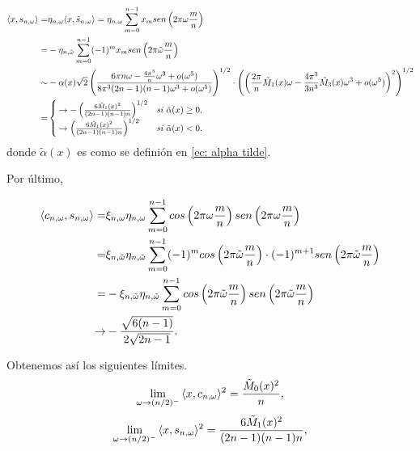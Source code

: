 \begin{align*}
\langle x,
s_{n, \omega}
\rangle = &
\eta_{n, \omega}
\langle
x, \tilde{s}_{n, \omega}
\rangle
= \eta_{n, \omega}
\sum\limits_{m=0}^{n-1}
x_{m}sen\left(
2 \pi \omega\frac{m}{n}
\right)
 \\
= &
- \eta_{n, \tilde{\omega}}
\sum\limits_{m=0}^{n-1}
(-1)^{m}
x_{m}sen\left(
2 \pi \tilde{\omega} \frac{m}{n}
\right)
 \\
\sim &
-\alpha(x)
\sqrt{2} 
\left(
\frac{
6 \pi n \omega -
\frac{4 \pi^{3}}{n} \omega^{3} + o(\omega^{5})
}{8 \pi^{3} (2n-1)(n-1)\omega^{3} + o(\omega^{5})
}
\right)^{1/2}
\cdot 
\left(
\left(
\frac{2 \pi}{n} \tilde{M}_{1}(x) \omega - \frac{4 \pi^{3}}{3n^{3}}
\tilde{M}_{3}(x) \omega^{3} 
 + o(\omega^{5})
\right)^{2}
\right)^{1/2}\\
= &
\begin{cases}
\rightarrow  - \left(
\frac{6 \tilde{M}_{1}(x)^{2}}{(2n-1)(n-1)n}
\right)^{1/2} & \textit{si } \tilde{\alpha}(x) \geq 0, \\
\rightarrow   \left(
\frac{6 \tilde{M}_{1}(x)^{2}}{(2n-1)(n-1)n}
\right)^{1/2} & \textit{si } \tilde{\alpha}(x) < 0.\\
\end{cases}
\end{align*}
donde $\tilde{\alpha}(x)$
es como se definión en
\ref{ec: alpha tilde}.

Por último, 

\begin{align*}
\langle
c_{n, \omega}, s_{n, \omega}
\rangle = &
\xi_{n, \omega} \eta_{n, \omega}
\suma{m=0}{n-1}{
cos\left(
2 \pi \omega\frac{m}{n}
\right)
sen\left(
2 \pi \omega\frac{m}{n}
\right)
} \\
= &
\xi_{n, \tilde{\omega}} \eta_{n, \tilde{\omega}}
\suma{m=0}{n-1}{
(-1)^{m}cos\left(
2 \pi \tilde{\omega} \frac{m}{n}
\right) \cdot (-1)^{m+1}
sen\left(
2 \pi \tilde{\omega} \frac{m}{n}
\right)
}
\\
= &
-\xi_{n, \tilde{\omega}} \eta_{n, \tilde{\omega}}
\suma{m=0}{n-1}{
cos\left(
2 \pi \tilde{\omega}\frac{m}{n}
\right) 
sen\left(
2 \pi \tilde{\omega}\frac{m}{n}
\right)
}
\\
\rightarrow &
- \frac{\sqrt{6(n-1)}}{2 \sqrt{2n-1}}.
\end{align*}

Obtenemos así los siguientes límites.
\begin{equation}
\label{ec: limite x, cnw cuadr n med}
\lim\limits_{\omega \rightarrow (n/2)^{-}}{\langle
x, c_{n, \omega}
\rangle^{2} }
= \frac{\tilde{M}_{0}(x)^{2}}{n},
\end{equation}
\begin{equation}
\label{ec: limite x, snw cuad n med}
\lim\limits_{\omega \rightarrow (n/2)^{-}}{\langle
x, s_{n, \omega}
\rangle^{2} }
= \frac{6\tilde{M}_{1}(x)^{2}}{(2n-1)(n-1)n},
\end{equation}

